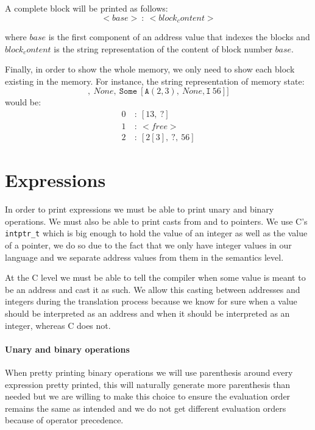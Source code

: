 A complete block will be printed as follows:
\begin{equation*}
<base>\ :\ <block_content> 
\end{equation*}

where $base$ is the first component of an address value that indexes the blocks and $block_content$ is the string representation of the content of block number $base$.

Finally, in order to show the whole memory, we only need to show each block existing in the memory.
For instance, the string representation of memory state:
\begin{equation*}
[\mathtt{Some}\ [\mathtt{I}\ 13,\ \mathtt{None}],\ None,\ \mathtt{Some}\ [\mathtt{A}(2,3),\ None, \mathtt{I}\ 56]]
\end{equation*}
would be:
\begin{align*}
0\ &:\ [13,\ ?] \\
1\ &:\ <free> \\
2\ &:\ [2[3],\ ?,\ 56]
\end{align*}


\section{Expressions}
In order to print expressions we must be able to print unary and binary operations.
We must also be able to print casts from and to pointers.
We use C's \verb|intptr_t| which is big enough to hold the value of an integer as well as the value of a pointer, we do so due to the fact that we only have integer values in our language and we separate address values from them in the semantics level.

At the C level we must be able to tell the compiler when some value is meant to be an address and cast it as such.
We allow this casting between addresses and integers during the translation process because we know for sure when a value should be interpreted as an address and when it should be interpreted as an integer, whereas C does not.

\paragraph{Unary and binary operations}
When pretty printing binary operations we will use parenthesis around every expression pretty printed, this will naturally generate more parenthesis than needed but we are willing to make this choice to ensure the evaluation order remains the same as intended and we do not get different evaluation orders because of operator precedence.


